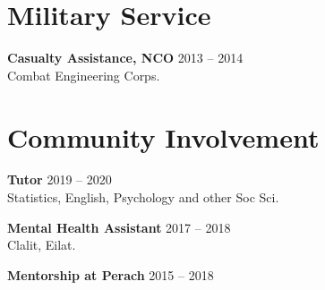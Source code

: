 \documentclass[
	12pt,a4paper %
]{article}
\begin{document}
\begin{paracol}{2}
\section{Military Service}
\textbf{Casualty Assistance, NCO} \hfill 2013 -- 2014 \\
Combat Engineering Corps.
 \section{Community Involvement}
 
 \textbf{Tutor} \hfill 2019 -- 2020 \\
  Statistics, English, Psychology and other Soc Sci.

 \textbf{Mental Health Assistant} \hfill 2017 -- 2018 \\
  Clalit, Eilat.

 \textbf{Mentorship at Perach} \hfill 2015 -- 2018
\end{paracol} %
\end{document}
